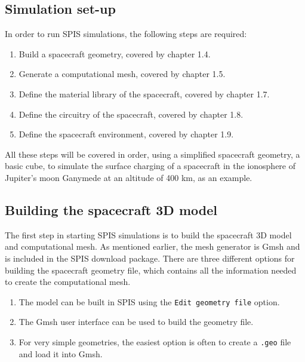 \documentclass[a4paper, 12pt]{article}
\begin{document}
\subsection{Simulation set-up}
\vspace{2mm}

In order to run SPIS simulations, the following steps are required:

\begin{enumerate}[itemsep=-0.2em]
    \item Build a spacecraft geometry, covered by chapter 1.4.
    \item Generate a computational mesh, covered by chapter 1.5.
    \item Define the material library of the spacecraft, covered by chapter 1.7.
    \item Define the circuitry of the spacecraft, covered by chapter 1.8.
    \item Define the spacecraft environment, covered by chapter 1.9.
\end{enumerate}

All these steps will be covered in order, using a simplified spacecraft geometry, a basic cube, to simulate the surface charging of a spacecraft in the ionosphere of Jupiter's moon Ganymede at an altitude of 400 km, as an example.

\subsection{Building the spacecraft 3D model}
\vspace{2mm}

The first step in starting SPIS simulations is to build the spacecraft 3D model and computational mesh. As mentioned earlier, the mesh generator is Gmsh and is included in the SPIS download package. There are three different options for building the spacecraft geometry file, which contains all the information needed to create the computational mesh.

\begin{enumerate}[label=\Alph*., itemsep=-0.2em]
    \item The model can be built in SPIS using the \verb|Edit geometry file| option.
    \item The Gmsh user interface can be used to build the geometry file.
    \item For very simple geometries, the easiest option is often to create a \verb|.geo| file and load it into Gmsh.
\end{enumerate}
\end{document}

